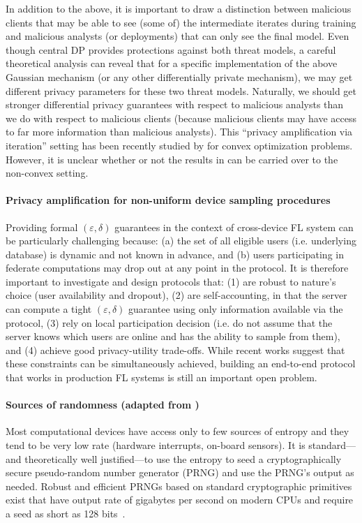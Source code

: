 In addition to the above, it is important to draw a distinction between malicious clients that may be able to see (some of) the intermediate iterates during training and malicious analysts (or deployments) that can only see the final model. Even though central DP provides protections against both threat models, a careful theoretical analysis can reveal that for a specific implementation of the above Gaussian mechanism (or any other differentially private mechanism), we may get different privacy parameters for these two threat models. Naturally, we should get stronger differential privacy guarantees with respect to malicious analysts than we do with respect to malicious clients (because malicious clients may have access to far more information than malicious analysts). This ``privacy amplification via iteration'' setting has been recently studied by \citet{feldman2018privacy} for convex optimization problems. However, it is unclear whether or not the results in \cite{feldman2018privacy} can be carried over to the non-convex setting.


\paragraph{Privacy amplification for non-uniform device sampling procedures}
Providing formal $(\varepsilon, \delta)$ guarantees in the context of cross-device FL system can be particularly challenging because: (a) the set of all eligible users (i.e. underlying database) is dynamic and not known in advance, and (b) users participating in federate computations may drop out at any point in the protocol. It is therefore important to investigate and design protocols that: (1) are robust to nature’s choice (user availability and dropout), (2) are self-accounting, in that the  server  can  compute a tight $(\varepsilon, \delta)$ guarantee using only information available via the protocol, (3) rely on local participation decision (i.e. do not assume that the server knows which users are online and has the ability to sample from them), and (4) achieve good privacy-utility trade-offs. While recent works \cite{balle2020privacy, kairouz2021practical} suggest that these constraints can be simultaneously achieved, building an end-to-end protocol that works in production FL systems is still an important open problem.

\paragraph{Sources of randomness (adapted from \cite{mcmahan2018general})}
Most computational devices have access only to few sources of entropy and they tend to be very low rate (hardware interrupts, on-board sensors). It is standard---and theoretically well justified---to use the entropy to seed a cryptographically secure pseudo-random number generator (PRNG) and use the PRNG's output as needed. Robust and efficient PRNGs based on standard cryptographic primitives exist that have output rate of gigabytes per second on modern CPUs and require a seed as short as 128 bits~\citep{salmon2011parallel}. 

